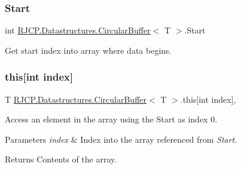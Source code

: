 \subsubsection{\texorpdfstring{Start}{Start}}
{\footnotesize\ttfamily int \mbox{\hyperlink{class_r_j_c_p_1_1_datastructures_1_1_circular_buffer}{R\+J\+C\+P.\+Datastructures.\+Circular\+Buffer}}$<$ T $>$.Start\hspace{0.3cm}{\ttfamily [get]}}



Get start index into array where data begins. 

\mbox{\label{class_r_j_c_p_1_1_datastructures_1_1_circular_buffer_a9f027715c774d6a816a266473b8ff44c}} 
\subsubsection{\texorpdfstring{this[int index]}{this[int index]}}
{\footnotesize\ttfamily T \mbox{\hyperlink{class_r_j_c_p_1_1_datastructures_1_1_circular_buffer}{R\+J\+C\+P.\+Datastructures.\+Circular\+Buffer}}$<$ T $>$.this\mbox{[}int index\mbox{]}\hspace{0.3cm}{\ttfamily [get]}, {\ttfamily [set]}}



Access an element in the array using the Start as index 0. 


\begin{DoxyParams}{Parameters}
{\em index} & Index into the array referenced from {\itshape Start}.\\
\hline
\end{DoxyParams}
\begin{DoxyReturn}{Returns}
Contents of the array.
\end{DoxyReturn}
\mbox{\label{class_r_j_c_p_1_1_datastructures_1_1_circular_buffer_aea438c0f691cf035c02a7fdbce551e01}} 
